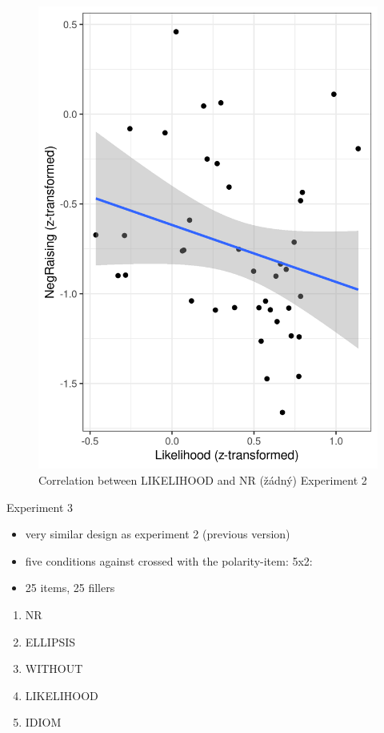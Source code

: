 \documentclass[
  ignorenonframetext,
]{beamer}
\providecommand{\tightlist}{%
  \setlength{\itemsep}{0pt}\setlength{\parskip}{0pt}}\usepackage{longtable,booktabs,array}
\newcommand{\cond}[1]{\textsc{#1}}
\begin{document}
\begin{frame}
\begin{figure}

{\centering \includegraphics{"exp2_correlation_zadny.png"}

}

\caption{Correlation between LIKELIHOOD and NR (žádný) Experiment 2}

\end{figure}
\end{frame}

\begin{frame}
\begin{block}{Experiment 3}
\protect\hypertarget{experiment-3}{}
\begin{itemize}
\tightlist
\item
  very similar design as experiment 2 (previous version)
\item
  five conditions against crossed with the polarity-item: 5x2:
\item
  25 items, 25 fillers
\end{itemize}

\begin{enumerate}
\item
  \cond{NR}
\item
  \cond{ELLIPSIS}
\item
  \cond{WITHOUT}
\item
  \cond{LIKELIHOOD}
\item
  \cond{IDIOM}
\end{enumerate}
\end{block}
\end{frame}
\end{document}
